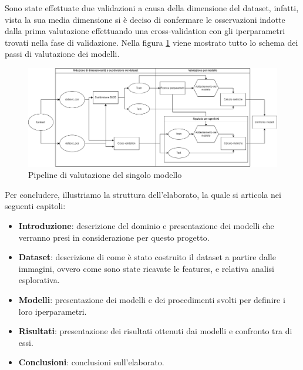 Sono state effettuate due validazioni a causa della dimensione del dataset,
infatti, vista la sua media dimensione si è deciso di confermare le osservazioni
indotte dalla prima valutazione effettuando una cross-validation con gli
iperparametri trovati nella fase di validazione. Nella figura \ref{fig:pipeline}
viene mostrato tutto lo schema dei passi di valutazione dei modelli.
\begin{figure}[!ht]
      \centering
      \includegraphics[width=\textwidth]{img/introduzione/schema_pipeline_valutazione_modelli.png}
      \caption{Pipeline di valutazione del singolo modello}
      \label{fig:pipeline}
\end{figure}

Per concludere, illustriamo la struttura dell'elaborato, la quale si articola
nei seguenti capitoli:
\begin{itemize}
      \item \textbf{Introduzione}: descrizione del dominio e presentazione dei
            modelli che verranno presi in considerazione per questo progetto.
      \item \textbf{Dataset}: descrizione di come è stato costruito il dataset a
            partire dalle immagini, ovvero come sono state ricavate le features,
            e relativa analisi esplorativa.
      \item \textbf{Modelli}: presentazione dei modelli e dei procedimenti svolti
            per definire i loro iperparametri.
      \item \textbf{Risultati}: presentazione dei risultati ottenuti dai modelli
            e confronto tra di essi.
      \item \textbf{Conclusioni}: conclusioni sull'elaborato.
\end{itemize}